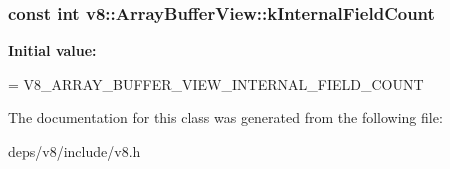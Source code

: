 \subsubsection[{k\+Internal\+Field\+Count}]{\setlength{\rightskip}{0pt plus 5cm}const int v8\+::\+Array\+Buffer\+View\+::k\+Internal\+Field\+Count\hspace{0.3cm}{\ttfamily [static]}}\label{classv8_1_1_array_buffer_view_a1cccb675b1a91e61411fee5918d451db}
{\bfseries Initial value\+:}
\begin{DoxyCode}
=
      V8\_ARRAY\_BUFFER\_VIEW\_INTERNAL\_FIELD\_COUNT
\end{DoxyCode}


The documentation for this class was generated from the following file\+:\begin{DoxyCompactItemize}
\item 
deps/v8/include/v8.\+h\end{DoxyCompactItemize}
